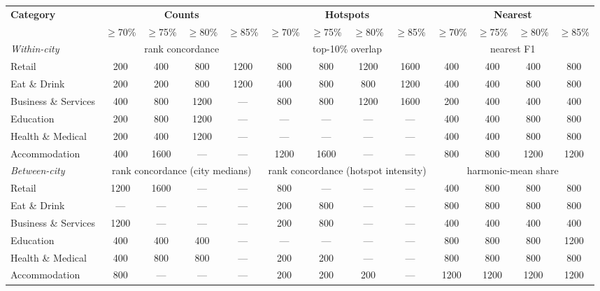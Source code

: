 \begin{tabular}{@{}lcccccccccccc@{}}
\toprule
\textbf{Category} & \multicolumn{4}{c}{\textbf{Counts}} & \multicolumn{4}{c}{\textbf{Hotspots}} & \multicolumn{4}{c}{\textbf{Nearest}} \\
\cmidrule(lr){2-5}
\cmidrule(lr){6-9}
\cmidrule(lr){10-13}
 & $\geq$70\% & $\geq$75\% & $\geq$80\% & $\geq$85\% & $\geq$70\% & $\geq$75\% & $\geq$80\% & $\geq$85\% & $\geq$70\% & $\geq$75\% & $\geq$80\% & $\geq$85\% \\
\midrule
\textit{Within-city} & \multicolumn{4}{c}{\footnotesize rank concordance} & \multicolumn{4}{c}{\footnotesize top-10\% overlap} & \multicolumn{4}{c}{\footnotesize nearest F1} \\
Retail & 200 & 400 & 800 & 1200 & 800 & 800 & 1200 & 1600 & 400 & 400 & 400 & 800 \\
Eat \& Drink & 200 & 200 & 800 & 1200 & 400 & 800 & 800 & 1200 & 400 & 400 & 800 & 800 \\
Business \& Services & 400 & 800 & 1200 & --- & 800 & 800 & 1200 & 1600 & 200 & 400 & 400 & 400 \\
Education & 200 & 800 & 1200 & --- & --- & --- & --- & --- & 400 & 400 & 800 & 800 \\
Health \& Medical & 200 & 400 & 1200 & --- & --- & --- & --- & --- & 400 & 400 & 800 & 800 \\
Accommodation & 400 & 1600 & --- & --- & 1200 & 1600 & --- & --- & 800 & 800 & 1200 & 1200 \\
\midrule
\textit{Between-city} & \multicolumn{4}{c}{\footnotesize rank concordance (city medians)} & \multicolumn{4}{c}{\footnotesize rank concordance (hotspot intensity)} & \multicolumn{4}{c}{\footnotesize harmonic-mean share} \\
Retail & 1200 & 1600 & --- & --- & 800 & --- & --- & --- & 400 & 800 & 800 & 800 \\
Eat \& Drink & --- & --- & --- & --- & 200 & 800 & --- & --- & 800 & 800 & 800 & 800 \\
Business \& Services & 1200 & --- & --- & --- & 200 & 800 & --- & --- & 400 & 400 & 400 & 400 \\
Education & 400 & 400 & 400 & --- & --- & --- & --- & --- & 800 & 800 & 800 & 1200 \\
Health \& Medical & 400 & 800 & 800 & --- & 200 & 200 & --- & --- & 800 & 800 & 800 & 800 \\
Accommodation & 800 & --- & --- & --- & 200 & 200 & 200 & --- & 1200 & 1200 & 1200 & 1200 \\
\bottomrule
\end{tabular}
